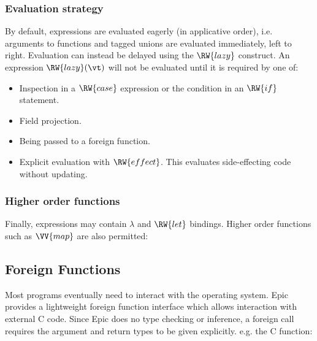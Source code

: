 \subsubsection*{Evaluation strategy}

By default, expressions are evaluated eagerly (in applicative order),
i.e. arguments to functions and tagged unions are evaluated
immediately, left to right. Evaluation can instead be delayed using
the $\RW{lazy}$ construct. An expression $\RW{lazy}(\vt)$ will not be
evaluated until it is required by one of:

\begin{itemize}
\item Inspection in a $\RW{case}$ expression or the condition in an
  $\RW{if}$ statement.
\item Field projection.
\item Being passed to a foreign function.
\item Explicit evaluation with $\RW{effect}$. This evaluates
  side-effecting code without updating.
\end{itemize}


\subsubsection*{Higher order functions}

Finally, expressions may contain $\lambda$ and $\RW{let}$
bindings. Higher order functions such as $\VV{map}$ are also permitted:


\subsection{Foreign Functions}

Most programs eventually need to interact with the operating
system. Epic provides a lightweight foreign function interface which
allows interaction with external C code.
Since Epic does no type checking or inference,
a foreign call requires the argument and return types to be given
explicitly. e.g. the C function:

